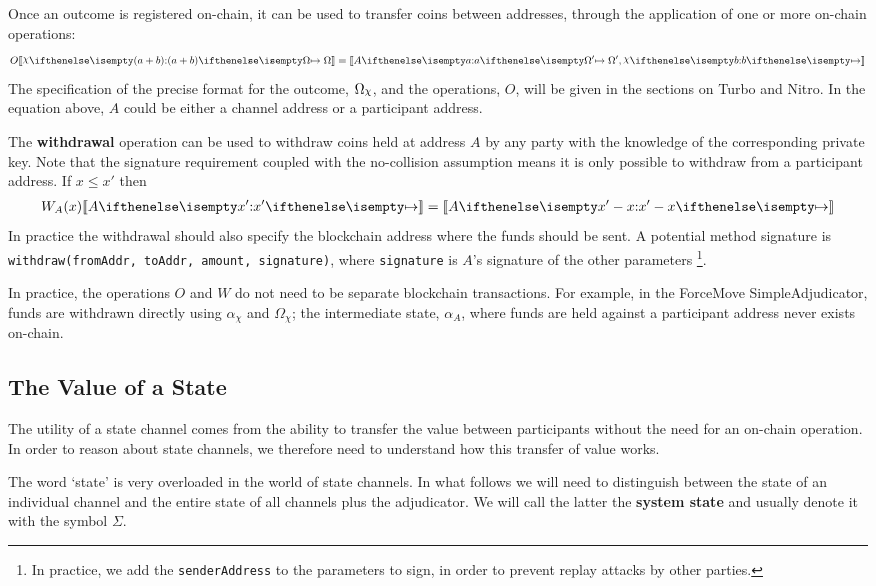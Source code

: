 \documentclass{article}
\begin{document}
Once an outcome is registered on-chain, it can be used to transfer coins between addresses,
through the application of one or more on-chain operations:
\begin{align*}
  O \adj{\holds{\rchi}{(a + b)}{\Omega}} = \adj{\holds{A}{a}{\Omega'
}, \holds{\rchi}{b}{}}
\end{align*}
The specification of the precise format for the outcome, $\Omega_\rchi$, and the operations, $O$,
will be given in the sections on Turbo and Nitro.
In the equation above, $A$ could be either a channel address or a participant address.

The \textbf{withdrawal} operation can be used to withdraw coins held at address $A$ by any
party with the knowledge of the corresponding private key. 
Note that the signature requirement coupled with the no-collision assumption means
it is only possible to withdraw from a participant address.
If $x \leq x'$ then
\begin{align*}
W_A(x) \adj{\holds{A}{x'}{}} = \adj{\holds{A}{x'-x}{}}
\end{align*}
In practice the withdrawal should also specify the blockchain address where the funds should be sent.
A potential method signature is \texttt{withdraw(fromAddr, toAddr, amount, signature)}, 
where \texttt{signature} is $A$'s signature of the other parameters
\footnote{In practice, we add the \texttt{senderAddress} to the parameters to sign,
in order to prevent replay attacks by other parties.}.

In practice, the operations $O$ and $W$ do not need to be separate blockchain transactions.
For example, in the ForceMove SimpleAdjudicator, funds are withdrawn directly using $\alpha_\chi$ and $\Omega_\chi$;
the intermediate state, $\alpha_A$, where funds are held against a participant address never exists on-chain.

\subsection{The Value of a State}\label{section:value-of-a-state}

The utility of a state channel comes from the ability to transfer the value
between participants without the need for an on-chain operation.
In order to reason about state channels, we therefore need to understand how this transfer
of value works.

The word `state' is very overloaded in the world of state channels.
In what follows we will need to distinguish between the state of an individual channel and
the entire state of all channels plus the adjudicator.
We will call the latter the \textbf{system state} and usually denote it with the symbol $\Sigma$.
\end{document}
